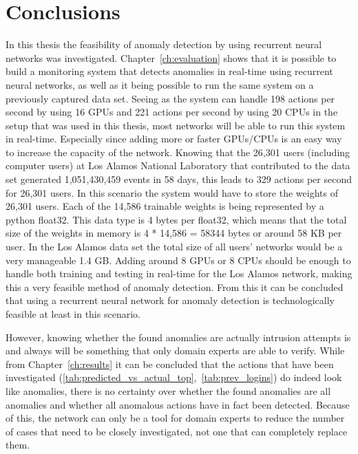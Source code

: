 \chapter{Conclusions}\label{ch:conclusions}

In this thesis the feasibility of anomaly detection by using recurrent neural networks was investigated. Chapter~\ref{ch:evaluation} shows that it is possible to build a monitoring system that detects anomalies in real-time using recurrent neural networks, as well as it being possible to run the same system on a previously captured data set. Seeing as the system can handle 198 actions per second by using 16 GPUs and 221 actions per second by using 20 CPUs in the setup that was used in this thesis, most networks will be able to run this system in real-time. Especially since adding more or faster GPUs/CPUs is an easy way to increase the capacity of the network. Knowing that the 26,301 users (including computer users) at Los Alamos National Laboratory that contributed to the data set generated 1,051,430,459 events in 58 days, this leads to 329 actions per second for 26,301 users. In this scenario the system would have to store the weights of 26,301 users. Each of the 14,586 trainable weights is being represented by a python float32. This data type is 4 bytes per float32, which means that the total size of the weights in memory is 4 * 14,586 = 58344 bytes or around 58 KB per user. In the Los Alamos data set the total size of all users' networks would be a very manageable 1.4 GB. Adding around 8 GPUs or 8 CPUs should be enough to handle both training and testing in real-time for the Los Alamos network, making this a very feasible method of anomaly detection. From this it can be concluded that using a recurrent neural network for anomaly detection is technologically feasible at least in this scenario. 

However, knowing whether the found anomalies are actually intrusion attempts is and always will be something that only domain experts are able to verify. While from Chapter~\ref{ch:results} it can be concluded that the actions that have been investigated (\ref{tab:predicted_vs_actual_top},~\ref{tab:prev_logins}) do indeed look like anomalies, there is no certainty over whether the found anomalies are all anomalies and whether all anomalous actions have in fact been detected. Because of this, the network can only be a tool for domain experts to reduce the number of cases that need to be closely investigated, not one that can completely replace them. 


